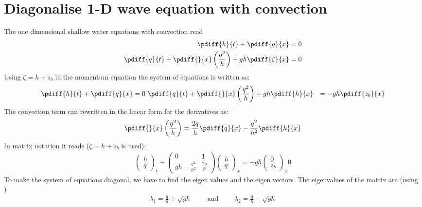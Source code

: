 \chapter{Diagonalise 1-D wave equation with convection}\label{sec:diagonalise_conservative_wave_with_convection}

The one dimensional shallow water equations  with convection
read
%
\begin{align}
    \pdiff{h}{t}  + \pdiff{q}{x} & = 0 \label{eq:continuity_for_diagonalisation}\\
    \pdiff{q}{t}  + \pdiff{}{x} \left( \frac{q^2}{h} \right) + g h \pdiff{\zeta}{x} & = 0 \label{eq:momentum_for_diagonalisation}
\end{align}
Using $\zeta = h +z_b$ in the momentum equation the system of equations is written as:
\begin{align}
    \pdiff{h}{t}  + \pdiff{q}{x} & = 0 \
    \pdiff{q}{t}  + \pdiff{}{x} \left( \frac{q^2}{h} \right) + g h \pdiff{h}{x} & = -gh\pdiff{z_b}{x}
\end{align}
The convection term can rewritten in the linear form for the derivatives as:
\begin{align}
    \pdiff{}{x} \left( \frac{q^2}{h} \right) = \frac{2 q}{h} \pdiff{q}{x} - \frac{q^2}{h^2}\pdiff{h}{x}
    \label{eq:convection_linear_form}
\end{align}
In matrix notation it reads ($\zeta = h +z_b$ is used):
\begin{align}
    \begin{pmatrix} h \\ q \end{pmatrix}_t +
    \begin{pmatrix} 0 & 1  \\ gh-\frac{q^2}{h^2} & \frac{2q}{h} \end{pmatrix}
    \begin{pmatrix} h \\ q \end{pmatrix}_x =
    -gh \begin{pmatrix} 0 \\ z_b \end{pmatrix}_x
    0
\end{align}
To make the system of equations diagonal, we have to find the eigen values and the eigen vectors.
The eigenvalues of the matrix are (using \maplesoft)
\begin{align}
    \lambda_1 = \frac{q}{h} + \sqrt{gh} \qquad \mbox{ and } \qquad
    \lambda_2 = \frac{q}{h} - \sqrt{gh}
\end{align}
